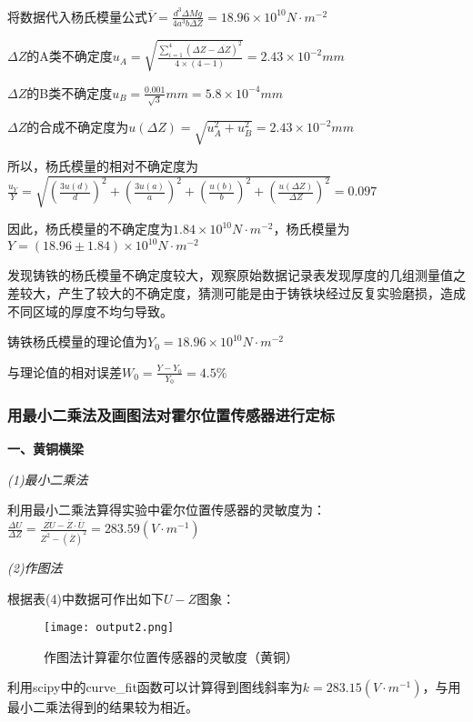 \documentclass[UTF-8,twoside,cs4size]{ctexart}
\begin{document}
将数据代入杨氏模量公式$\overline Y  = \frac{{{d^3}\Delta Mg}}{{4{a^3}b\Delta Z}} = 18.96 \times {10^{10}}N \cdot {m^{ - 2}}$\par
$\Delta Z$的A类不确定度${u_A} = \sqrt {\frac{{{{\sum\limits_{i = 1}^4 {\left( {\Delta Z - \overline {\Delta Z} } \right)} }^2}}}{{4 \times \left( {4 - 1} \right)}}}  = 2.43 \times {10^{ - 2}}mm$\par
$\Delta Z$的B类不确定度${u_B} = \frac{{0.001}}{{\sqrt 3 }}mm = 5.8 \times {10^{ - 4}}mm$\par
$\Delta Z$的合成不确定度为$u\left( {\Delta Z} \right) = \sqrt {u_A^2 + u_B^2}  = 2.43 \times {10^{ - 2}}mm$\par
所以，杨氏模量的相对不确定度为$\frac{{{u_Y}}}{Y} = \sqrt {{{\left( {\frac{{3u\left( d \right)}}{d}} \right)}^2} + {{\left( {\frac{{3u\left( a \right)}}{a}} \right)}^2} + {{\left( {\frac{{u\left( b \right)}}{b}} \right)}^2} + {{\left( {\frac{{u\left( {\Delta Z} \right)}}{{\Delta Z}}} \right)}^2}}  = 0.097$\par
因此，杨氏模量的不确定度为$1.84 \times {10^{ 10}}N \cdot {m^{ - 2}}$，杨氏模量为$Y = \left( {18.96 \pm 1.84} \right) \times {10^{ 10}}N \cdot {m^{ - 2}}$\par
发现铸铁的杨氏模量不确定度较大，观察原始数据记录表发现厚度的几组测量值之差较大，产生了较大的不确定度，猜测可能是由于铸铁块经过反复实验磨损，造成不同区域的厚度不均匀导致。\par
铸铁杨氏模量的理论值为${Y_0} = 18.96 \times {10^{10}}N \cdot {m^{ - 2}}$\par
与理论值的相对误差${W_0} = \frac{{Y - {Y_0}}}{{{Y_0}}} = 4.5\% $

\subsubsection{用最小二乘法及画图法对霍尔位置传感器进行定标}
\textbf{一、黄铜横梁}

\textit{(1)最小二乘法}

    利用最小二乘法算得实验中霍尔位置传感器的灵敏度为：
    $\frac{{\Delta U}}{{\Delta Z}} = \frac{{\overline {ZU}  - \overline Z  \cdot \overline U }}{{\overline {{Z^2}}  - {{\left( {\overline Z } \right)}^2}}} = 283.59 \left( {V \cdot {m^{ - 1}}} \right)$\par
	
\textit{(2)作图法}
	
	根据表(4)中数据可作出如下$ U-Z $图象：
    \begin{figure}[!h]
        \centering
        \texttt{[image: output2.png]}
        \caption{作图法计算霍尔位置传感器的灵敏度（黄铜）}
    \end{figure}
    利用scipy中的curve_fit函数可以计算得到图线斜率为$ k=283.15(V\cdot m^{-1}) $，与用最小二乘法得到的结果较为相近。
\end{document}
